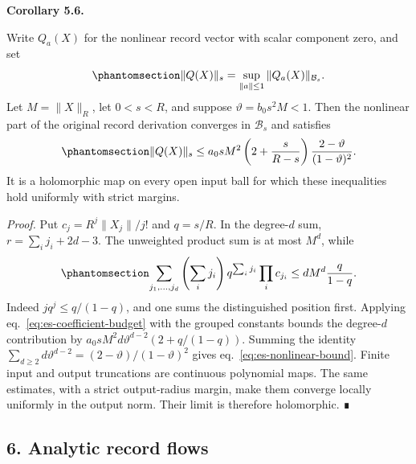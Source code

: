 \documentclass[
  english,
  11pt,
  reqno]{amsart}
\makeatletter
\newcommand{\pandocstatementheading}[1]{%
  \par\addpenalty{\@beginparpenalty}%
  \addvspace{.5\baselineskip plus .2\baselineskip minus .2\baselineskip}%
  {\normalfont\bfseries #1\par}%
  \nobreak\@afterindenttrue\@afterheading
}
\makeatother
\begin{document}
\pandocstatementheading{\protect{}\label{cor:es-nonlinear-field}Corollary 5.6.}

Write \(Q_a(X)\) for the nonlinear record vector with scalar component
zero, and set
\begin{equation}\protect\phantomsection\label{eq:es-nonlinear-field-norm}{
 \|Q(X)\|_s=\sup_{\|a\|\le1}\|Q_a(X)\|_{\mathcal B_s}.
}\end{equation} Let \(M=\|X\|_R\), let \(0<s<R\), and suppose
\(\vartheta=b_0s^2M<1\). Then the nonlinear part of the original record
derivation converges in \(\mathcal B_s\) and satisfies
\begin{equation}\protect\phantomsection\label{eq:es-nonlinear-bound}{
 \|Q(X)\|_s
 \le a_0sM^2\left(2+\frac{s}{R-s}\right)
                    \frac{2-\vartheta}{(1-\vartheta)^2}.
}\end{equation} It is a holomorphic map on every open input ball for
which these inequalities hold uniformly with strict margins.

\emph{Proof.} Put \(c_j=R^j\|X_j\|/j!\) and \(q=s/R\). In the
degree-\(d\) sum, \(r=\sum_i j_i+2d-3\). The unweighted product sum is
at most \(M^d\), while
\begin{equation}\protect\phantomsection\label{eq:es-weighted-product-bound}{
 \sum_{j_1,\ldots,j_d}\left(\sum_i j_i\right)
        q^{\sum_i j_i}\prod_i c_{j_i}
 \le dM^d\frac{q}{1-q}.
}\end{equation} Indeed \(j q^j\le q/(1-q)\), and one sums the
distinguished position first. Applying
eq.~\ref{eq:es-coefficient-budget} with the grouped constants bounds the
degree-\(d\) contribution by \(a_0sM^2d\vartheta^{d-2}(2+q/(1-q))\).
Summing the identity
\(\sum_{d\ge2}d\vartheta^{d-2}=(2-\vartheta)/(1-\vartheta)^2\) gives
eq.~\ref{eq:es-nonlinear-bound}. Finite input and output truncations are
continuous polynomial maps. The same estimates, with a strict
output-radius margin, make them converge locally uniformly in the output
norm. Their limit is therefore holomorphic. ∎

\protect{}\label{sec:es-flows}

\subsection{6. Analytic record flows}\label{analytic-record-flows}
\end{document}
